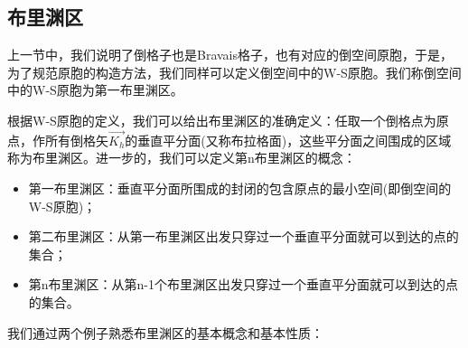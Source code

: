 \documentclass{ctexart}
\begin{document}
        \subsection{布里渊区}
        上一节中，我们说明了倒格子也是Bravais格子，也有对应的倒空间原胞，于是，为了规范原胞的构造方法，我们同样可以定义倒空间中的W-S原胞。我们称倒空间中的W-S原胞为第一布里渊区。
        
        根据W-S原胞的定义，我们可以给出布里渊区的准确定义：任取一个倒格点为原点，作所有倒格矢$\vec{K_h}$的垂直平分面(又称布拉格面)，这些平分面之间围成的区域称为布里渊区。进一步的，我们可以定义第n布里渊区的概念：
        \begin{itemize}
            \item 第一布里渊区：垂直平分面所围成的封闭的包含原点的最小空间(即倒空间的W-S原胞)；
            \item 第二布里渊区：从第一布里渊区出发只穿过一个垂直平分面就可以到达的点的集合；
            \item 第n布里渊区：从第n-1个布里渊区出发只穿过一个垂直平分面就可以到达的点的集合。
        \end{itemize}
        
        我们通过两个例子熟悉布里渊区的基本概念和基本性质：
        
\end{document}
